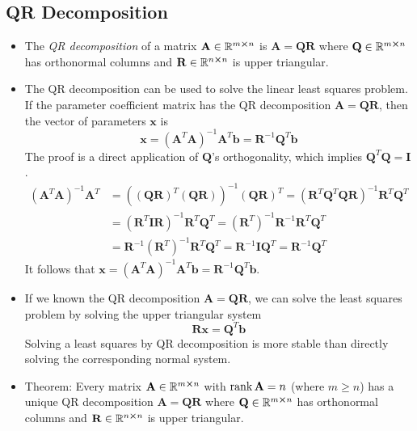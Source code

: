 \documentclass[11pt, a4paper]{article}
\newcommand{\R}{\mathbb{R}} %
\newcommand{\mat}[1]{\mathbf{#1}} %
\begin{document}
\subsection{QR Decomposition}
\begin{itemize}
	\item The \textit{QR decomposition} of a matrix $ \mat{A} \in \R^{m \cross n} $ is $ \mat{A} = \mat{Q} \mat{R} $ where $ \mat{Q} \in \R^{m \cross n} $ has orthonormal columns and $ \mat{R} \in \R^{n \cross n} $ is upper triangular.
	
	\item The QR decomposition can be used to solve the linear least squares problem. If the parameter coefficient matrix has the QR decomposition $ \mat{A} = \mat{Q} \mat{R}  $, then the vector of parameters $ \bm{x} $ is 
	\begin{equation*}
		\bm{x} = \left(\mat{A}^{T}\mat{A} \right)^{-1} \mat{A}^{T} \mat{b} = \mat{R}^{-1}\mat{Q}^{T} \bm{b}
	\end{equation*}
	The proof is a direct application of $ \mat{Q} $'s orthogonality, which implies $ \mat{Q}^{T} \mat{Q} = \mat{I} $.
	\begin{align*}
		\left(\mat{A}^{T}\mat{A} \right)^{-1} \mat{A}^{T} &= \left((\mat{Q}\mat{R})^{T} (\mat{Q}\mat{R}) \right)^{-1} (\mat{Q}\mat{R})^{T} = \left(\mat{R}^{T}\mat{Q}^{T}\mat{Q}\mat{R}\right)^{-1} \mat{R}^{T} \mat{Q}^{T}\\
		&= \left(\mat{R}^{T}\mat{I}\mat{R}\right)^{-1} \mat{R}^{T} \mat{Q}^{T} = \left(\mat{R}^{T}\right)^{-1}\mat{R}^{-1} \mat{R}^{T} \mat{Q}^{T} \\
		&= \mat{R}^{-1} \left(\mat{R}^{T}\right)^{-1} \mat{R}^{T} \mat{Q}^{T} = \mat{R}^{-1} \mat{I} \mat{Q}^{T} = \mat{R}^{-1} \mat{Q}^{T}
	\end{align*}
	It follows that $ \bm{x} =  \left(\mat{A}^{T}\mat{A} \right)^{-1} \mat{A}^{T} \mat{b} = \mat{R}^{-1}\mat{Q}^{T} \bm{b} $.
	
	\item If we known the QR decomposition $ \mat{A} = \mat{Q} \mat{R}  $, we can solve the least squares problem by solving the upper triangular system
	\begin{equation*}
		\mat{R} \bm{x} = \mat{Q}^{T} \bm{b}
	\end{equation*}
	Solving a least squares by QR decomposition is more stable than directly solving the corresponding normal system.
	
	\item Theorem: Every matrix $ \mat{A} \in \R^{m \cross n} $ with $ \rank \mat{A} = n $ (where $ m \geq n $) has a unique QR decomposition $ \mat{A} = \mat{Q} \mat{R} $ where $ \mat{Q} \in \R^{m \cross n} $ has orthonormal columns and $ \mat{R} \in \R^{n \cross n} $ is upper triangular.
	
\end{itemize}
\end{document}
